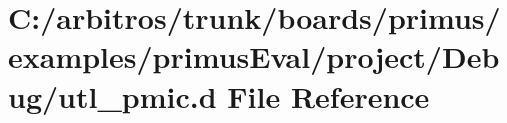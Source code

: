 \hypertarget{boards_2primus_2examples_2primus_eval_2project_2_debug_2utl__pmic_8d}{\section{C\-:/arbitros/trunk/boards/primus/examples/primus\-Eval/project/\-Debug/utl\-\_\-pmic.d File Reference}
\label{boards_2primus_2examples_2primus_eval_2project_2_debug_2utl__pmic_8d}
}
